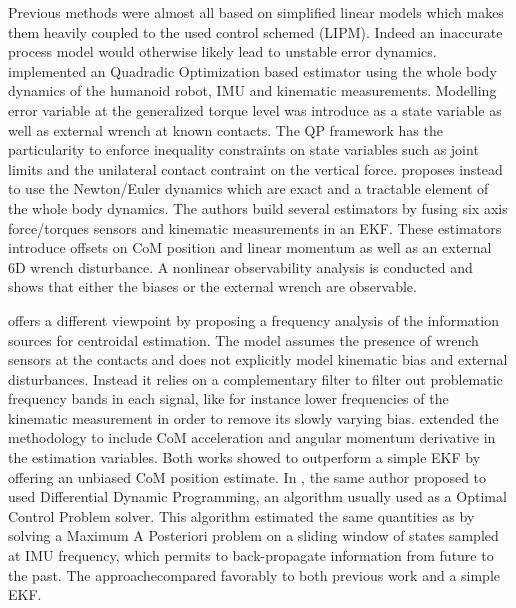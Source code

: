 Previous methods were almost all based on simplified linear models which makes them heavily coupled to the used control schemed (LIPM). Indeed an inaccurate process model
would otherwise likely lead to unstable error dynamics. \cite{xinjilefu2014dynamic} implemented an Quadradic Optimization based estimator using the whole body dynamics
of the humanoid robot, IMU and kinematic measurements. Modelling error variable at the generalized torque level was introduce as a state variable as well as external wrench at known contacts. 
The QP framework has the particularity to enforce inequality constraints on state variables such as joint limits and the unilateral contact contraint on the vertical force.
\cite{rotella2015humanoid} proposes instead to use the Newton/Euler dynamics which are exact 
and a tractable element of the whole body dynamics. The authors build several estimators by fusing six axis force/torques sensors and kinematic measurements in an EKF. 
These estimators introduce offsets on CoM position and linear momentum as well as an external 6D wrench disturbance. A nonlinear observability analysis is conducted 
and shows that either the biases or the external wrench are observable. 

\cite{carpentier2016center} offers a different viewpoint by proposing a frequency analysis of the information sources for centroidal estimation. The model
assumes the presence of wrench sensors at the contacts and does not explicitly model kinematic bias and external disturbances. Instead it relies on a complementary filter
to filter out problematic frequency bands in each signal, like for instance lower frequencies of the kinematic measurement in order to remove its slowly varying bias. 
\cite{bailly2019recursive} extended the methodology to include CoM acceleration and angular momentum derivative in the estimation variables. Both works showed to outperform
a simple EKF by offering an unbiased CoM position estimate.
In \cite{bailly2021optimal}, the same author proposed to used Differential Dynamic Programming, an algorithm usually used as a Optimal Control Problem solver.
This algorithm estimated the same quantities as \cite{bailly2019recursive} by solving a Maximum A Posteriori problem on a sliding window of states sampled at IMU frequency, 
which permits to back-propagate information from future to the past. The approachecompared favorably to both previous work \cite{bailly2019recursive} and a simple EKF.





